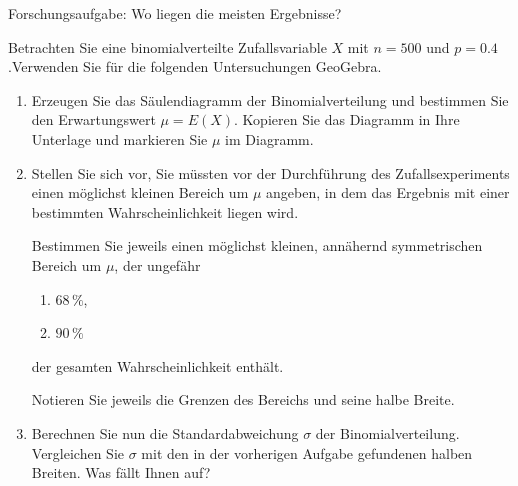 \begin{LA}
    {Forschungsaufgabe: Wo liegen die meisten Ergebnisse?}{}

    Betrachten Sie eine binomialverteilte Zufallsvariable \(X\) mit \(n=500\) und \(p=0.4\).Verwenden Sie für die folgenden Untersuchungen GeoGebra.

    \begin{enumerate}
        \item Erzeugen Sie das Säulendiagramm der Binomialverteilung und bestimmen Sie den Erwartungswert \(\mu = E(X)\). Kopieren Sie das Diagramm in Ihre Unterlage und markieren Sie \(\mu\) im Diagramm.

        \item Stellen Sie sich vor, Sie müssten vor der Durchführung des Zufallsexperiments einen möglichst kleinen Bereich um \(\mu\) angeben, in dem das Ergebnis mit einer bestimmten Wahrscheinlichkeit liegen wird.

              Bestimmen Sie jeweils einen möglichst kleinen, annähernd symmetrischen Bereich um \(\mu\), der ungefähr
              \begin{enumerate}
                  \item \(68\,\%\),
                  \item \(90\,\%\)
              \end{enumerate}
              der gesamten Wahrscheinlichkeit enthält.

              Notieren Sie jeweils die Grenzen des Bereichs und seine halbe Breite.

        \item Berechnen Sie nun die Standardabweichung \(\sigma\) der Binomialverteilung. Vergleichen Sie \(\sigma\) mit den in der vorherigen Aufgabe gefundenen halben Breiten. Was fällt Ihnen auf?


\end{enumerate}
\end{LA}
